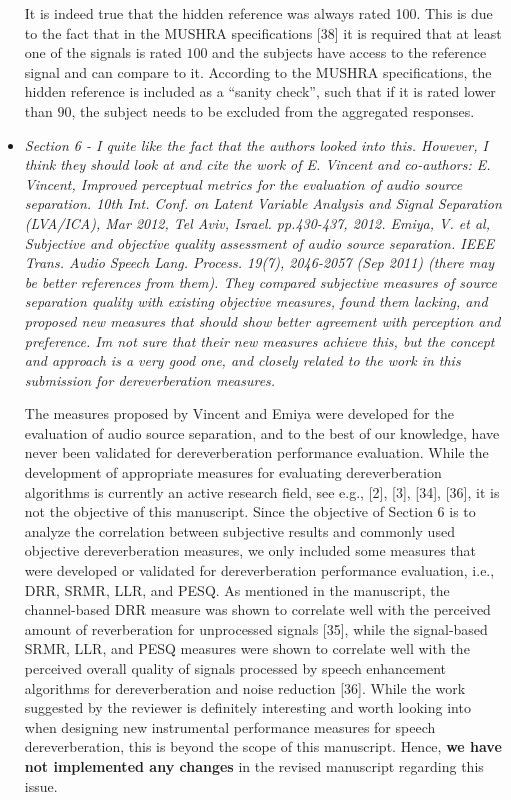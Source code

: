\documentclass[10pt, a4paper]{article}
\begin{document}
\begin{itemize}
It is indeed true that the hidden reference was always rated 100.
This is due to the fact that in the MUSHRA specifications [38] it is required that at least one of the signals is rated $100$ and the subjects have access to the reference signal and can compare to it. 
According to the MUSHRA specifications, the hidden reference is included as a ``sanity check'', such that if it is rated lower than $90$, the subject needs to be excluded from the aggregated responses.

\item {\textit{Section 6 - I quite like the fact that the authors looked into this. However, I think they should look at and cite the work of E. Vincent and co-authors: E. Vincent, Improved perceptual metrics for the evaluation of audio source separation. 10th Int. Conf. on Latent Variable Analysis and Signal Separation (LVA/ICA), Mar 2012, Tel Aviv, Israel. pp.430-437, 2012. Emiya, V. et al, Subjective and objective quality assessment of audio source separation. IEEE Trans. Audio Speech Lang. Process. 19(7), 2046-2057 (Sep 2011) (there may be better references from them).
They compared subjective measures of source separation quality with existing objective measures, found them lacking, and proposed new measures that should show better agreement with perception and preference. Im not sure that their new measures achieve this, but the concept and approach is a very good one, and closely related to the work in this submission for dereverberation measures.}}

The measures proposed by Vincent and Emiya were developed for the evaluation of audio source separation, and to the best of our knowledge, have never been validated for dereverberation performance evaluation.
While the development of appropriate measures for evaluating dereverberation algorithms is currently an active research field, see e.g., [2], [3], [34], [36], it is not the objective of this manuscript.
Since the objective of Section 6 is to analyze the correlation between subjective results and commonly used objective dereverberation measures, we only included some measures that were developed or validated for dereverberation performance evaluation, i.e., DRR, SRMR, LLR, and PESQ.
As mentioned in the manuscript, the channel-based DRR measure was shown to correlate well with the perceived amount of reverberation for unprocessed signals [35], while the signal-based SRMR, LLR, and PESQ measures were shown to correlate well with the perceived overall quality of signals processed by speech enhancement algorithms for dereverberation and noise reduction [36].
While the work suggested by the reviewer is definitely interesting and worth looking into when designing new instrumental performance measures for speech dereverberation, this is beyond the scope of this manuscript. 
Hence, {\textbf{we have not implemented any changes}} in the revised manuscript regarding this issue.


\end{itemize}
\end{document}

